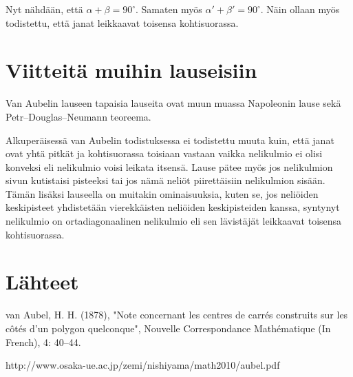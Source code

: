 \documentclass{scrartcl}
\begin{document}
Nyt nähdään, että $\alpha + \beta = 90^\circ$. Samaten myös $\alpha' + \beta' = 90^\circ$. Näin ollaan myös todistettu, että janat leikkaavat toisensa kohtisuorassa.


\pagebreak
\section{Viitteitä muihin lauseisiin}

Van Aubelin lauseen tapaisia lauseita ovat muun muassa Napoleonin lause sekä Petr–Douglas–Neumann teoreema.

Alkuperäisessä van Aubelin todistuksessa ei todistettu muuta kuin, että janat ovat yhtä pitkät ja kohtisuorassa toisiaan vastaan vaikka nelikulmio ei olisi konveksi eli nelikulmio voisi leikata itsensä. Lause pätee myös jos nelikulmion sivun kutistaisi pisteeksi tai jos nämä neliöt piirettäisiin nelikulmion sisään. 
Tämän lisäksi lauseella on muitakin ominaisuuksia, kuten se, jos neliöiden keskipisteet yhdistetään vierekkäisten neliöiden keskipisteiden kanssa, syntynyt nelikulmio on ortadiagonaalinen nelikulmio eli sen lävistäjät leikkaavat toisensa kohtisuorassa.

\pagebreak
\section{Lähteet}
van Aubel, H. H. (1878), "Note concernant les centres de carrés construits sur les côtés d'un polygon quelconque", Nouvelle Correspondance Mathématique (In French), 4: 40–44.

http://www.osaka-ue.ac.jp/zemi/nishiyama/math2010/aubel.pdf
\end{document}
